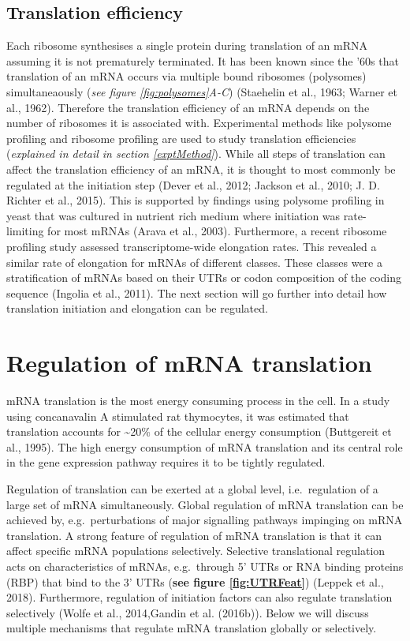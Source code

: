 \documentclass[12pt,openany]{book}
\begin{document}
\subsection{Translation efficiency}

Each ribosome synthesises a single protein during translation of an mRNA
assuming it is not prematurely terminated. It has been known since the
'60s that translation of an mRNA occurs via multiple bound ribosomes
(polysomes) simultaneaously (\emph{see figure \ref{fig:polysomes}A-C})
(Staehelin et al., 1963; Warner et al., 1962). Therefore the translation
efficiency of an mRNA depends on the number of ribosomes it is
associated with. Experimental methods like polysome profiling and
ribosome profiling are used to study translation efficiencies
(\emph{explained in detail in section \ref{exptMethod}}). While all
steps of translation can affect the translation efficiency of an mRNA,
it is thought to most commonly be regulated at the initiation step
(Dever et al., 2012; Jackson et al., 2010; J. D. Richter et al., 2015).
This is supported by findings using polysome profiling in yeast that was
cultured in nutrient rich medium where initiation was rate-limiting for
most mRNAs (Arava et al., 2003). Furthermore, a recent ribosome
profiling study assessed transcriptome-wide elongation rates. This
revealed a similar rate of elongation for mRNAs of different classes.
These classes were a stratification of mRNAs based on their UTRs or
codon composition of the coding sequence (Ingolia et al., 2011). The
next section will go further into detail how translation initiation and
elongation can be regulated. \newline
\section{Regulation of mRNA translation} \label{regmRNA}

mRNA translation is the most energy consuming process in the cell. In a
study using concanavalin A stimulated rat thymocytes, it was estimated
that translation accounts for \textasciitilde{}20\% of the cellular
energy consumption (Buttgereit et al., 1995). The high energy
consumption of mRNA translation and its central role in the gene
expression pathway requires it to be tightly regulated.

Regulation of translation can be exerted at a global level,
i.e.~regulation of a large set of mRNA simultaneously. Global regulation
of mRNA translation can be achieved by, e.g.~perturbations of major
signalling pathways impinging on mRNA translation. A strong feature of
regulation of mRNA translation is that it can affect specific mRNA
populations selectively. Selective translational regulation acts on
characteristics of mRNAs, e.g.~through 5' UTRs or RNA binding proteins
(RBP) that bind to the 3' UTRs (\textbf{see figure \ref{fig:UTRFeat}})
(Leppek et al., 2018). Furthermore, regulation of initiation factors can
also regulate translation selectively (Wolfe et al., 2014,Gandin et al.
(2016b)). Below we will discuss multiple mechanisms that regulate mRNA
translation globally or selectively.
\end{document}
